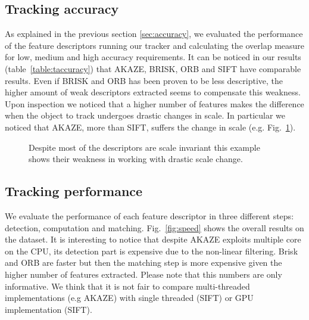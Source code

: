 \subsection{Tracking accuracy}

As explained in the previous section \ref{sec:accuracy}, we evaluated the performance of the feature descriptors running our tracker and calculating the overlap measure for low, medium and high accuracy requirements. It can be noticed in our results (table~\ref{table:taccuracy}) that AKAZE, BRISK, ORB and SIFT have comparable results. Even if BRISK and ORB has been proven to be less descriptive, the higher amount of weak descriptors extracted seems to compensate this weakness. Upon inspection we noticed that a higher number of features makes the difference when the object to track undergoes drastic changes in scale. In particular we noticed that AKAZE, more than SIFT, suffers the change in scale (e.g. Fig.~\ref{fig:tracking_results_scale}). 

\begin{figure}[t]
	\vspace{2mm}
\centerline{%
	}
	\vspace{-2mm}
\caption{Despite most of the descriptors are scale invariant this example shows their weakness in working with drastic scale change.}
\vspace{-3mm}
\label{fig:tracking_results_scale}
\end{figure} 

\subsection{Tracking performance}

We evaluate the performance of each feature descriptor in three different steps: detection, computation and matching. Fig.~\ref{fig:speed} shows the overall results on the dataset. It is interesting to notice that despite AKAZE exploits multiple core on the CPU, its detection part is expensive due to the non-linear filtering. Brisk and ORB are faster but then the matching step is more expensive given the higher number of features extracted. Please note that this numbers are only informative. We think that it is not fair to compare multi-threaded implementations (e.g AKAZE) with single threaded (SIFT) or GPU implementation (SIFT).

